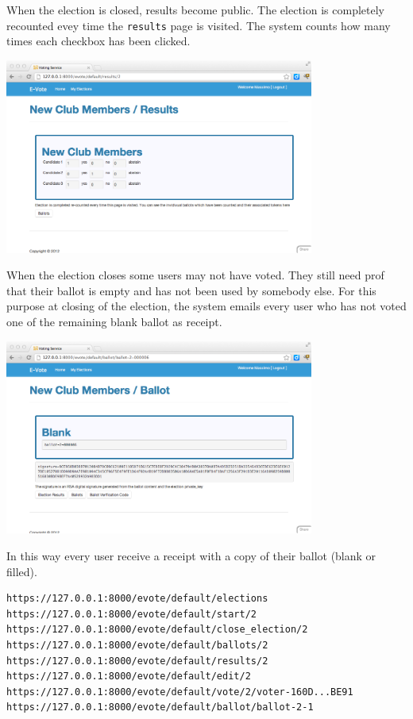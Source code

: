 \documentclass[12pt]{article}
\begin{document}
When the election is closed, results become public. The election is completely recounted evey time the {\tt results} page is visited. The system counts how many times each checkbox has been clicked.

\begin{center}
\includegraphics[width=4in]{images/results.png}
\end{center}

When the election closes some users may not have voted. They still need prof that their ballot is empty and has not been used by somebody else. For this purpose at closing of the election, the system emails every user who has not voted one of the remaining blank ballot as receipt.

\begin{center}
\includegraphics[width=4in]{images/ballot-blank.png}
\end{center}

In this way every user receive a receipt with a copy of their ballot (blank or filled).


\begin{verbatim}
https://127.0.0.1:8000/evote/default/elections
https://127.0.0.1:8000/evote/default/start/2
https://127.0.0.1:8000/evote/default/close_election/2
https://127.0.0.1:8000/evote/default/ballots/2
https://127.0.0.1:8000/evote/default/results/2
https://127.0.0.1:8000/evote/default/edit/2
https://127.0.0.1:8000/evote/default/vote/2/voter-160D...BE91
https://127.0.0.1:8000/evote/default/ballot/ballot-2-1
\end{verbatim}
\end{document}
